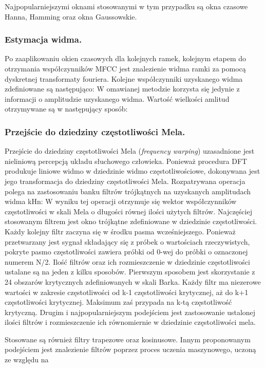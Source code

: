 Najpopularniejszymi oknami stosowanymi w tym przypadku są okna czasowe Hanna, Hamming oraz okna Gaussowskie.

\subsubsection{Estymacja widma.}
Po zaaplikowaniu okien czasowych dla kolejnych ramek, kolejnym etapem do otrzymania współczynników MFCC jest znalezienie widma ramki za pomocą dyskretnej transformaty fouriera. Kolejne współczynniki uzyskanego widma zdefiniowane są następująco:
W omawianej metodzie korzysta się jedynie z informacji o amplitudzie uzyskanego widma. Wartość wielkości amlitud otrzymywane są w następujący sposób:

\subsubsection{Przejście do dziedziny częstotliwości Mela.}
Przejście do dziedziny częstotliwości Mela (\textit{frequency warping}) uzasadnione jest nieliniową percepcją układu słuchowego człowieka. Ponieważ procedura DFT produkuje liniowe widmo w dziedzinie widmo częstotliwościowe, dokonywana jest jego transformacja do dziedziny częstotliwości Mela. 
Rozpatrywana operacja polega na zastosowaniu banku filtrów trójkątnych na uzyskanych amplitudach widma kHn:
W wyniku tej operacji otrzymuje się wektor współczynników częstotliwości w skali Mela o długości równej ilości użytych filtrów. Najczęściej stosowanym filtrem jest okno trójkątne zdefiniowane w dziedzinie częstotliwości. Każdy kolejny filtr zaczyna się w środku pasma wcześniejszego. Ponieważ przetwarzany jest sygnał składający się z próbek o wartościach rzeczywistych, pokryte pasmo częstotliwości zawiera próbki od 0-wej do próbki o oznaczonej numerem N/2. Ilość filtrów oraz ich rozmieszczenie w dziedzinie częstotliwości ustalane są na jeden z kilku sposobów.
Pierwszym sposobem jest skorzystanie z 24 obszarów krytycznych zdefiniowanych w skali Barka. Każdy filtr ma niezerowe wartości w zakresie częstotliwości od k-1 częstotliwości krytycznej, aż do k+1 częstotliwości krytycznej. Maksimum zaś przypada na k-tą częstotliwość krytyczną.
Drugim i najpopularniejszym podejściem jest zastosowanie ustalonej ilości filtrów i rozmieszczenie ich równomiernie w dziedzinie częstotliwości mela.

Stosowane są również filtry trapezowe oraz kosinusowe. Innym proponowanym podejściem jest znalezienie filtrów poprzez proces uczenia maszynowego, uczoną ze względu na %

